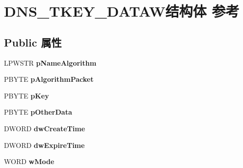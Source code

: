\hypertarget{struct_d_n_s___t_k_e_y___d_a_t_a_w}{}\section{D\+N\+S\+\_\+\+T\+K\+E\+Y\+\_\+\+D\+A\+T\+A\+W结构体 参考}
\label{struct_d_n_s___t_k_e_y___d_a_t_a_w}
\subsection*{Public 属性}
\begin{DoxyCompactItemize}
\item 
\mbox{\label{struct_d_n_s___t_k_e_y___d_a_t_a_w_a1c2857ccce464e9c1921a753214da051}} 
L\+P\+W\+S\+TR {\bfseries p\+Name\+Algorithm}
\item 
\mbox{\label{struct_d_n_s___t_k_e_y___d_a_t_a_w_a96ea28edc2641d105850e074af96c548}} 
P\+B\+Y\+TE {\bfseries p\+Algorithm\+Packet}
\item 
\mbox{\label{struct_d_n_s___t_k_e_y___d_a_t_a_w_a9de3ec9474afbcf941abbd86cadac953}} 
P\+B\+Y\+TE {\bfseries p\+Key}
\item 
\mbox{\label{struct_d_n_s___t_k_e_y___d_a_t_a_w_a58beb366153f6638913d0fe05793e642}} 
P\+B\+Y\+TE {\bfseries p\+Other\+Data}
\item 
\mbox{\label{struct_d_n_s___t_k_e_y___d_a_t_a_w_af3eff8038c901baab00cbae231dc6af2}} 
D\+W\+O\+RD {\bfseries dw\+Create\+Time}
\item 
\mbox{\label{struct_d_n_s___t_k_e_y___d_a_t_a_w_ac87ac4f6b3a3c95c143c55bdfa817596}} 
D\+W\+O\+RD {\bfseries dw\+Expire\+Time}
\item 
\mbox{\label{struct_d_n_s___t_k_e_y___d_a_t_a_w_a0054c139fe23e7fe67c68a35f2550387}} 
W\+O\+RD {\bfseries w\+Mode}
\item 
\mbox{\label{struct_d_n_s___t_k_e_y___d_a_t_a_w_a687d06a4edfa842293851c4ac1ef9938}} 

\end{DoxyCompactItemize}
